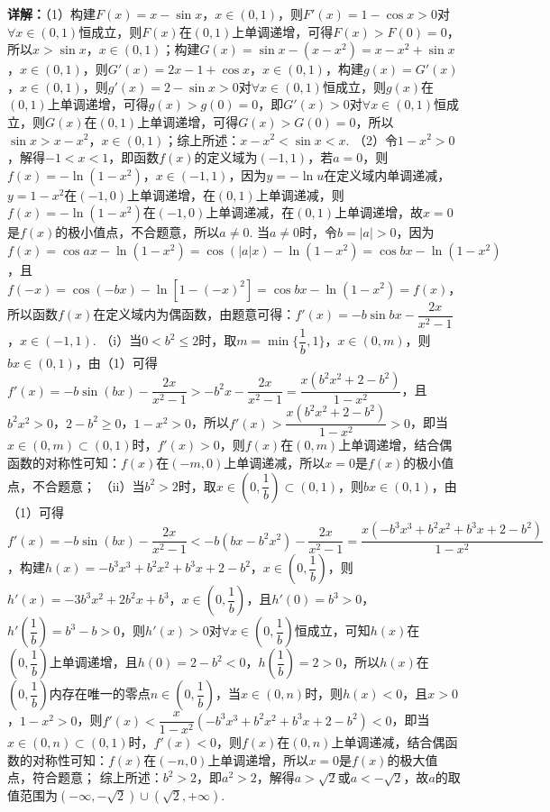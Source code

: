 \begin{question}[points=10]
\begin{solution}
\textbf{详解：}（1）构建$F(x)=x-\sin x$，$x\in(0,1)$，则$F'(x)=1-\cos x>0$对$\forall x\in(0,1)$恒成立，则$F(x)$在$(0,1)$上单调递增，可得$F(x)>F(0)=0$，所以$x>\sin x$，$x\in(0,1)$；构建$G(x)=\sin x-(x-x^{2})=x-x^{2}+\sin x$，$x\in(0,1)$，则$G'(x)=2x-1+\cos x$，$x\in(0,1)$，构建$g(x)=G'(x)$，$x\in(0,1)$，则$g'(x)=2-\sin x>0$对$\forall x\in(0,1)$恒成立，则$g(x)$在$(0,1)$上单调递增，可得$g(x)>g(0)=0$，即$G'(x)>0$对$\forall x\in(0,1)$恒成立，则$G(x)$在$(0,1)$上单调递增，可得$G(x)>G(0)=0$，所以$\sin x>x-x^{2}$，$x\in(0,1)$；综上所述：$x-x^{2}<\sin x<x$.
（2）令$1-x^{2}>0$，解得$-1<x<1$，即函数$f(x)$的定义域为$(-1,1)$，若$a=0$，则$f(x)=-\ln(1-x^{2})$，$x\in(-1,1)$，因为$y=-\ln u$在定义域内单调递减，$y=1-x^{2}$在$(-1,0)$上单调递增，在$(0,1)$上单调递减，则$f(x)=-\ln(1-x^{2})$在$(-1,0)$上单调递减，在$(0,1)$上单调递增，故$x=0$是$f(x)$的极小值点，不合题意，所以$a\neq0$.
当$a\neq0$时，令$b=|a|>0$，因为$f(x)=\cos ax-\ln(1-x^{2})=\cos(|a|x)-\ln(1-x^{2})=\cos bx-\ln(1-x^{2})$，且$f(-x)=\cos(-bx)-\ln[1-(-x)^{2}]=\cos bx-\ln(1-x^{2})=f(x)$，所以函数$f(x)$在定义域内为偶函数，由题意可得：$f'(x)=-b\sin bx-\dfrac{2x}{x^{2}-1}$，$x\in(-1,1)$.
（i）当$0<b^{2}\le 2$时，取$m=\min\{\dfrac{1}{b},1\}$，$x\in(0,m)$，则$bx\in(0,1)$，由（1）可得$f'(x)=-b\sin(bx)-\dfrac{2x}{x^{2}-1}>-b^{2}x-\dfrac{2x}{x^{2}-1}=\dfrac{x(b^{2}x^{2}+2-b^{2})}{1-x^{2}}$，且$b^{2}x^{2}>0$，$2-b^{2}\ge0$，$1-x^{2}>0$，所以$f'(x)>\dfrac{x(b^{2}x^{2}+2-b^{2})}{1-x^{2}}>0$，即当$x\in(0,m)\subset(0,1)$时，$f'(x)>0$，则$f(x)$在$(0,m)$上单调递增，结合偶函数的对称性可知：$f(x)$在$(-m,0)$上单调递减，所以$x=0$是$f(x)$的极小值点，不合题意；
（ii）当$b^{2}>2$时，取$x\in(0,\dfrac{1}{b})\subset(0,1)$，则$bx\in(0,1)$，由（1）可得$f'(x)=-b\sin(bx)-\dfrac{2x}{x^{2}-1}<-b(bx-b^{2}x^{2})-\dfrac{2x}{x^{2}-1}=\dfrac{x(-b^{3}x^{3}+b^{2}x^{2}+b^{3}x+2-b^{2})}{1-x^{2}}$，构建$h(x)=-b^{3}x^{3}+b^{2}x^{2}+b^{3}x+2-b^{2}$，$x\in(0,\dfrac{1}{b})$，则$h'(x)=-3b^{3}x^{2}+2b^{2}x+b^{3}$，$x\in(0,\dfrac{1}{b})$，且$h'(0)=b^{3}>0$，$h'(\dfrac{1}{b})=b^{3}-b>0$，则$h'(x)>0$对$\forall x\in(0,\dfrac{1}{b})$恒成立，可知$h(x)$在$(0,\dfrac{1}{b})$上单调递增，且$h(0)=2-b^{2}<0$，$h(\dfrac{1}{b})=2>0$，所以$h(x)$在$(0,\dfrac{1}{b})$内存在唯一的零点$n\in(0,\dfrac{1}{b})$，当$x\in(0,n)$时，则$h(x)<0$，且$x>0$，$1-x^{2}>0$，则$f'(x)<\dfrac{x}{1-x^{2}}(-b^{3}x^{3}+b^{2}x^{2}+b^{3}x+2-b^{2})<0$，即当$x\in(0,n)\subset(0,1)$时，$f'(x)<0$，则$f(x)$在$(0,n)$上单调递减，结合偶函数的对称性可知：$f(x)$在$(-n,0)$上单调递增，所以$x=0$是$f(x)$的极大值点，符合题意；
综上所述：$b^{2}>2$，即$a^{2}>2$，解得$a>\sqrt{2}$或$a<-\sqrt{2}$，故$a$的取值范围为$(-\infty,-\sqrt{2})\cup(\sqrt{2},+\infty)$.
\end{solution}
\end{question}

